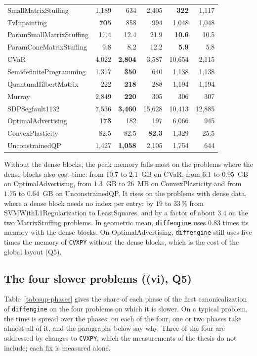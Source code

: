 \documentclass[letterpaper,12pt]{article}
\begin{document}
{\begin{longtable}{l rrrrr}
SmallMatrixStuffing & 1{,}189 & 634 & 2{,}405 & \textbf{322} & 1{,}117 \\
TvInpainting & \textbf{705} & 858 & 994 & 1{,}048 & 1{,}048 \\
ParamSmallMatrixStuffing & 17.4 & 12.4 & 21.9 & \textbf{10.6} & 10.5 \\
ParamConeMatrixStuffing & 9.8 & 8.2 & 12.2 & \textbf{5.9} & 5.8 \\
CVaR & 4{,}022 & \textbf{2{,}804} & 3{,}587 & 10{,}654 & 2{,}115 \\
SemidefiniteProgramming & 1{,}317 & \textbf{350} & 640 & 1{,}138 & 1{,}138 \\
QuantumHilbertMatrix & 222 & \textbf{218} & 288 & 1{,}194 & 1{,}194 \\
Murray & 2{,}849 & \textbf{220} & 305 & 306 & 307 \\
SDPSegfault1132 & 7{,}536 & \textbf{3{,}460} & 15{,}628 & 10{,}413 & 12{,}885 \\
OptimalAdvertising & \textbf{173} & 182 & 197 & 6{,}066 & 945 \\
ConvexPlasticity & 82.5 & 82.5 & \textbf{82.3} & 1{,}329 & 25.5 \\
UnconstrainedQP & 1{,}427 & \textbf{1{,}058} & 2{,}105 & 1{,}754 & 644 \\
\end{longtable}}

Without the dense blocks, the peak memory falls most on the problems where the dense blocks
also cost time: from $10.7$ to $2.1$~GB on CVaR, from $6.1$ to $0.95$~GB on OptimalAdvertising,
from $1.3$~GB to $26$~MB on ConvexPlasticity and from $1.75$ to $0.64$~GB on UnconstrainedQP. It
rises on the problems with dense data, where a dense block needs no index per entry: by $19$ to
$33\,\%$ from SVMWithL1Regularization to LeastSquares, and by a factor of about $3.4$ on the two
MatrixStuffing problems. In geometric mean, \texttt{diffengine} uses $0.83$ times its memory with the dense
blocks. On OptimalAdvertising, \texttt{diffengine} still uses five times the memory of
\texttt{CVXPY} without the dense blocks, which is the cost of the global layout (Q5).

\subsection{The four slower problems ((vi), Q5)}\label{sec:res-slower}

Table~\ref{tab:sup-phases} gives the share of each phase of the first canonicalization of
\texttt{diffengine} on the four problems on which it is slower. On a typical problem, the time is spread over the phases; on each of the four,
one or two phases take almost all of it, and the paragraphs below say why. Three of the four are
addressed by changes to \texttt{CVXPY}, which the measurements of the thesis do not include;
each fix is measured alone.
\end{document}
